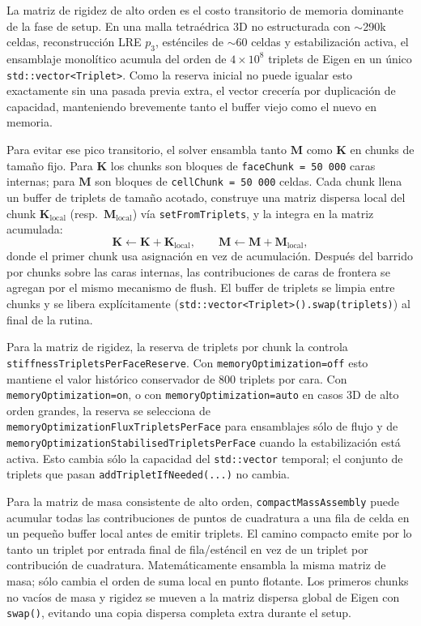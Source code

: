 \documentclass[11pt,a4paper]{article}
\newcommand{\code}[1]{\texttt{\small #1}}
\newcommand{\Mmass}{\mathbf{M}}
\newcommand{\Kstif}{\mathbf{K}}
\begin{document}
La matriz de rigidez de alto orden es el costo transitorio de memoria dominante de la fase de
setup. En una malla tetraédrica 3D no estructurada con $\sim$290k celdas, reconstrucción LRE
$p_3$, esténciles de $\sim$60 celdas y estabilización activa, el ensamblaje monolítico
acumula del orden de $4\times 10^8$ triplets de Eigen en un único
\code{std::vector<Triplet>}. Como la reserva inicial no puede igualar esto exactamente sin una
pasada previa extra, el vector crecería por duplicación de capacidad, manteniendo brevemente
tanto el buffer viejo como el nuevo en memoria.

Para evitar ese pico transitorio, el solver ensambla tanto $\Mmass$ como $\Kstif$ en chunks
de tamaño fijo. Para $\Kstif$ los chunks son bloques de \code{faceChunk = 50\,000} caras
internas; para $\Mmass$ son bloques de \code{cellChunk = 50\,000} celdas. Cada chunk llena un
buffer de triplets de tamaño acotado, construye una matriz dispersa local del chunk
$\Kstif_{\mathrm{local}}$ (resp.\ $\Mmass_{\mathrm{local}}$) vía \code{setFromTriplets}, y la
integra en la matriz acumulada:
\begin{equation}
  \Kstif \leftarrow \Kstif + \Kstif_{\mathrm{local}},
  \qquad
  \Mmass \leftarrow \Mmass + \Mmass_{\mathrm{local}},
  \label{eq:chunk-fold}
\end{equation}
donde el primer chunk usa asignación en vez de acumulación. Después del barrido por chunks
sobre las caras internas, las contribuciones de caras de frontera se agregan por el mismo
mecanismo de flush. El buffer de triplets se limpia entre chunks y se libera explícitamente
(\code{std::vector<Triplet>().swap(triplets)}) al final de la rutina.

Para la matriz de rigidez, la reserva de triplets por chunk la controla
\code{stiffnessTripletsPerFaceReserve}. Con \code{memoryOptimization=off} esto mantiene el
valor histórico conservador de 800 triplets por cara. Con \code{memoryOptimization=on}, o con
\code{memoryOptimization=auto} en casos 3D de alto orden grandes, la reserva se selecciona de
\code{memoryOptimizationFluxTripletsPerFace} para ensamblajes sólo de flujo y de
\code{memoryOptimizationStabilisedTripletsPerFace} cuando la estabilización está activa. Esto
cambia sólo la capacidad del \code{std::vector} temporal; el conjunto de triplets que pasan
\code{addTripletIfNeeded(...)} no cambia.

Para la matriz de masa consistente de alto orden, \code{compactMassAssembly} puede acumular
todas las contribuciones de puntos de cuadratura a una fila de celda en un pequeño buffer
local antes de emitir triplets. El camino compacto emite por lo tanto un triplet por entrada
final de fila/esténcil en vez de un triplet por contribución de cuadratura. Matemáticamente
ensambla la misma matriz de masa; sólo cambia el orden de suma local en punto flotante. Los
primeros chunks no vacíos de masa y rigidez se mueven a la matriz dispersa global de Eigen con
\code{swap()}, evitando una copia dispersa completa extra durante el setup.
\end{document}
